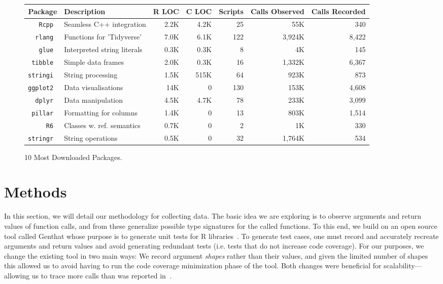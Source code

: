 \documentclass[acmsmall,10pt,review,anonymous]{acmart}\settopmatter{printfolios=true,printccs=false,printacmref=false}
\newcommand{\genthat}{{\sc Genthat}\xspace}
\begin{document}
\begin{figure}[!th]{\footnotesize\begin{tabular}{@{}r||l|r|r|r|r|r@{}}\hline
\bf Package & \bf Description & \bf R LOC &\bf C LOC &\bf Scripts & \bf Calls Observed & \bf Calls Recorded \\
\hline
\tt Rcpp  & Seamless C++ integration & 2.2K & 4.2K & 25 & 55K & 340 \\
\tt rlang & Functions for 'Tidyverse' & 7.0K & 6.1K & 122 & 3,924K & 8,422 \\
\tt glue  & Interpreted string literals & 0.3K & 0.3K & 8 & 4K & 145 \\
\tt tibble & Simple data frames & 2.0K & 0.3K & 16 & 1,332K & 6,367 \\
\tt stringi &  String processing & 1.5K & 515K & 64 & 923K & 873 \\
\tt ggplot2 & Data visualisations & 14K & 0 & 130 & 153K & 4,608 \\
\tt dplyr  &  Data manipulation & 4.5K & 4.7K & 78 & 233K & 3,099 \\
\tt pillar & Formatting for columns & 1.4K & 0 & 13 & 803K & 1,514 \\
\tt R6 & Classes w. ref. semantics & 0.7K & 0 & 2 & 1K & 330 \\
\tt stringr & String operations & 0.5K & 0 & 32 & 1,764K & 534 \\
\end{tabular}}\caption{10 Most Downloaded Packages.}\label{most}
\end{figure}

\newpage
\section{Methods}

In this section, we will detail our methodology for collecting data.  The
basic idea we are exploring is to observe arguments and return values of
function calls, and from these generalize possible type signatures for the
called functions. To this end, we build on an open source tool called
\genthat whose purpose is to generate unit tests for R
libraries~\cite{issta18}.  To generate test cases, one must record and
accurately recreate arguments and return values and avoid generating
redundant tests (i.e. tests that do not increase code coverage). For our
purposes, we change the existing tool in two main ways: We record argument
\emph{shapes} rather than their values, and given the limited number of shapes
this allowed us to avoid having to run the code coverage minimization phase of
the tool. Both changes were beneficial for scalability---allowing us to
trace more calls than was reported in~\cite{issta18}.
\end{document}

